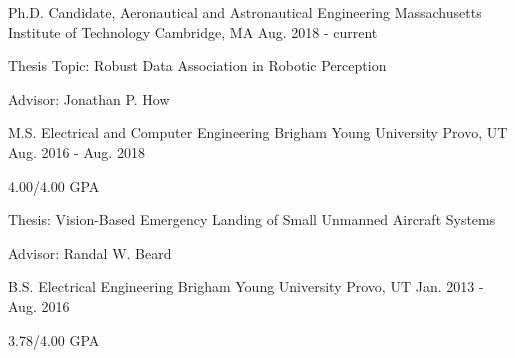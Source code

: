 

\begin{cventries}

\cventry
	{Ph.D. Candidate, Aeronautical and Astronautical Engineering} %
	{Massachusetts Institute of Technology} %
	{Cambridge, MA} %
	{Aug. 2018 - current} %
	{
		\begin{cvitems} %
      \item Thesis Topic: Robust Data Association in Robotic Perception
			\item Advisor: Jonathan P. How
		\end{cvitems}
	}

\cventry
	{M.S. Electrical and Computer Engineering} %
	{Brigham Young University} %
	{Provo, UT} %
	{Aug. 2016 - Aug. 2018} %
	{
		\begin{cvitems} %
			\item 4.00/4.00 GPA
      \item Thesis: Vision-Based Emergency Landing of Small Unmanned Aircraft Systems
			\item Advisor: Randal W. Beard
		\end{cvitems}
	}
	
  \cventry
    {B.S. Electrical Engineering} %
    {Brigham Young University} %
    {Provo, UT} %
    {Jan. 2013 - Aug. 2016} %
    {
      \begin{cvitems} %
        \item 3.78/4.00 GPA
      \end{cvitems}
    }

\end{cventries}
